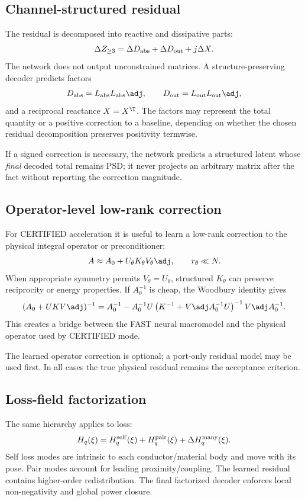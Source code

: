 \subsection{Channel-structured residual}

The residual is decomposed into reactive and dissipative parts:
\[
 \Delta Z_{\ge3}
 =
 \Delta D_{\rm abs}
 +\Delta D_{\rm out}
 +j\Delta X.
\]
The network does not output unconstrained matrices. A structure-preserving
decoder predicts factors
\[
 D_{\rm abs}
 =
 L_{\rm abs}L_{\rm abs}\adj,\qquad
 D_{\rm out}
 =
 L_{\rm out}L_{\rm out}\adj,
\]
and a reciprocal reactance $X=X^\T$. The factors may represent the total
quantity or a positive correction to a baseline, depending on whether the
chosen residual decomposition preserves positivity termwise.

If a signed correction is necessary, the network predicts a structured latent
whose \emph{final} decoded total remains PSD; it never projects an arbitrary
matrix after the fact without reporting the correction magnitude.

\subsection{Operator-level low-rank correction}

For CERTIFIED acceleration it is useful to learn a low-rank correction to the
physical integral operator or preconditioner:
\[
  A
  \approx
  A_0+U_\theta K_\theta V_\theta\adj ,
  \qquad
  r_\theta\ll N.
\]
When appropriate symmetry permits $V_\theta=U_\theta$, structured $K_\theta$
can preserve reciprocity or energy properties. If $A_0^{-1}$ is cheap, the
Woodbury identity gives
\[
 (A_0+UKV\adj)^{-1}
 =
 A_0^{-1}
 -A_0^{-1}U
 \left(K^{-1}+V\adj A_0^{-1}U\right)^{-1}
 V\adj A_0^{-1}.
\]
This creates a bridge between the FAST neural macromodel and the physical
operator used by CERTIFIED mode.

The learned operator correction is optional; a port-only residual model may be
used first. In all cases the true physical residual remains the acceptance
criterion.

\subsection{Loss-field factorization}

The same hierarchy applies to loss:
\[
  H_q(\xi)
  =
  H_q^{\rm self}(\xi)
  +H_q^{\rm pair}(\xi)
  +\Delta H_q^{\rm many}(\xi).
\]
Self loss modes are intrinsic to each conductor/material body and move with its
pose. Pair modes account for leading proximity/coupling. The learned residual
contains higher-order redistribution. The final factorized decoder enforces
local non-negativity and global power closure.

